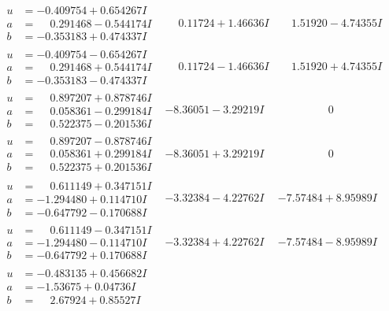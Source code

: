 \documentclass[1p]{elsarticle_modified}
\theoremstyle{definition}
\begin{document}
$$\begin{array}{c|c|c}
\begin{aligned}
u &= -0.409754 + 0.654267 I \\
a &= \phantom{-}0.291468 - 0.544174 I \\
b &= -0.353183 + 0.474337 I\end{aligned}
 & \phantom{-}0.11724 + 1.46636 I & \phantom{-}1.51920 - 4.74355 I \\ \hline\begin{aligned}
u &= -0.409754 - 0.654267 I \\
a &= \phantom{-}0.291468 + 0.544174 I \\
b &= -0.353183 - 0.474337 I\end{aligned}
 & \phantom{-}0.11724 - 1.46636 I & \phantom{-}1.51920 + 4.74355 I \\ \hline\begin{aligned}
u &= \phantom{-}0.897207 + 0.878746 I \\
a &= \phantom{-}0.058361 - 0.299184 I \\
b &= \phantom{-}0.522375 - 0.201536 I\end{aligned}
 & -8.36051 - 3.29219 I & \phantom{-0.000000 } 0 \\ \hline\begin{aligned}
u &= \phantom{-}0.897207 - 0.878746 I \\
a &= \phantom{-}0.058361 + 0.299184 I \\
b &= \phantom{-}0.522375 + 0.201536 I\end{aligned}
 & -8.36051 + 3.29219 I & \phantom{-0.000000 } 0 \\ \hline\begin{aligned}
u &= \phantom{-}0.611149 + 0.347151 I \\
a &= -1.294480 + 0.114710 I \\
b &= -0.647792 - 0.170688 I\end{aligned}
 & -3.32384 - 4.22762 I & -7.57484 + 8.95989 I \\ \hline\begin{aligned}
u &= \phantom{-}0.611149 - 0.347151 I \\
a &= -1.294480 - 0.114710 I \\
b &= -0.647792 + 0.170688 I\end{aligned}
 & -3.32384 + 4.22762 I & -7.57484 - 8.95989 I \\ \hline\begin{aligned}
u &= -0.483135 + 0.456682 I \\
a &= -1.53675 + 0.04736 I \\
b &= \phantom{-}2.67924 + 0.85527 I\end{aligned}

\end{array}$$
\end{document}
